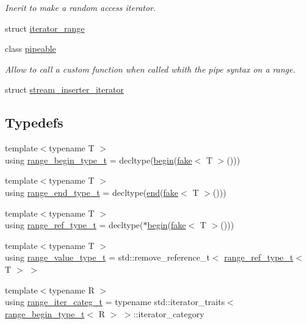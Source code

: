 \begin{DoxyCompactItemize}
\begin{DoxyCompactList}\small\item\em Inerit to make a random access iterator. \end{DoxyCompactList}\item 
struct \mbox{\hyperlink{structrah_1_1iterator__range}{iterator\+\_\+range}}
\item 
class \mbox{\hyperlink{structrah_1_1pipeable}{pipeable}}
\begin{DoxyCompactList}\small\item\em Allow to call a custom function when called whith the \textquotesingle{}pipe\textquotesingle{} syntax on a range. \end{DoxyCompactList}\item 
struct \mbox{\hyperlink{structrah_1_1stream__inserter__iterator}{stream\+\_\+inserter\+\_\+iterator}}
\end{DoxyCompactItemize}
\subsection*{Typedefs}
\begin{DoxyCompactItemize}
\item 
{\footnotesize template$<$typename T $>$ }\\using \mbox{\hyperlink{namespacerah_a28aff4eeddcece6be65ff0b956d32d4a}{range\+\_\+begin\+\_\+type\+\_\+t}} = decltype(\mbox{\hyperlink{namespacerah_a2c4a19e57cc4e0753e93830f247def6d}{begin}}(\mbox{\hyperlink{namespacerah_a11785bbdf970efa1bc57fc14993b77bf}{fake}}$<$ T $>$()))
\item 
{\footnotesize template$<$typename T $>$ }\\using \mbox{\hyperlink{namespacerah_a9657e24ae477f4482225b133fe286b65}{range\+\_\+end\+\_\+type\+\_\+t}} = decltype(\mbox{\hyperlink{namespacerah_aaddd1442cd76b96876e692cdefe7261d}{end}}(\mbox{\hyperlink{namespacerah_a11785bbdf970efa1bc57fc14993b77bf}{fake}}$<$ T $>$()))
\item 
{\footnotesize template$<$typename T $>$ }\\using \mbox{\hyperlink{namespacerah_a6622426bea22e9509614fe4c574ebeca}{range\+\_\+ref\+\_\+type\+\_\+t}} = decltype($\ast$\mbox{\hyperlink{namespacerah_a2c4a19e57cc4e0753e93830f247def6d}{begin}}(\mbox{\hyperlink{namespacerah_a11785bbdf970efa1bc57fc14993b77bf}{fake}}$<$ T $>$()))
\item 
{\footnotesize template$<$typename T $>$ }\\using \mbox{\hyperlink{namespacerah_a4b32e39fb106af7036b20a39c4f024c1}{range\+\_\+value\+\_\+type\+\_\+t}} = std\+::remove\+\_\+reference\+\_\+t$<$ \mbox{\hyperlink{namespacerah_a6622426bea22e9509614fe4c574ebeca}{range\+\_\+ref\+\_\+type\+\_\+t}}$<$ T $>$ $>$
\item 
{\footnotesize template$<$typename R $>$ }\\using \mbox{\hyperlink{namespacerah_aff9b9a5748e293f6a1726308c1ac1a01}{range\+\_\+iter\+\_\+categ\+\_\+t}} = typename std\+::iterator\+\_\+traits$<$ \mbox{\hyperlink{namespacerah_a28aff4eeddcece6be65ff0b956d32d4a}{range\+\_\+begin\+\_\+type\+\_\+t}}$<$ R $>$ $>$\+::iterator\+\_\+category
\end{DoxyCompactItemize}
